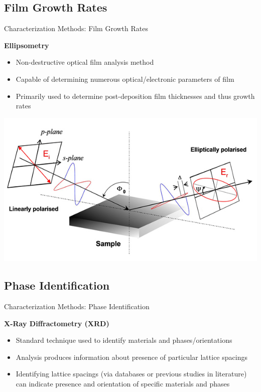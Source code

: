 \documentclass[professionalfont]{beamer}
\begin{document}
\subsection{Film Growth Rates}
\begin{frame}{Characterization Methods: Film Growth Rates}
\begin{overprint}
		\vspace{0.5cm}
		\textbf{\large Ellipsometry}\vspace{1.5em}
		\begin{itemize}
			\item Non-destructive optical film analysis method\vspace{1.5em}
			\item Capable of determining numerous optical/electronic parameters of film\vspace{1.5em}
			\item Primarily used to determine post-deposition film thicknesses and thus growth rates
		\end{itemize}
		\centerline{\includegraphics[width=\textwidth]{./graphics/characterization/ellipsometryDiagram_simple}}
\end{overprint}
\end{frame}

\subsection{Phase Identification}
\begin{frame}{Characterization Methods: Phase Identification}

\textbf{\large X-Ray Diffractometry (XRD)}
\vspace{1.5em}
\begin{itemize}
	\item Standard technique used to identify materials and phases/orientations
	\vspace{1.5em}
	\item Analysis produces information about presence of particular lattice spacings
	\vspace{1.5em}
	\item Identifying lattice spacings (via databases or previous studies in literature) can indicate presence and orientation of specific materials and phases 
\end{itemize}

\end{frame}
\end{document}
